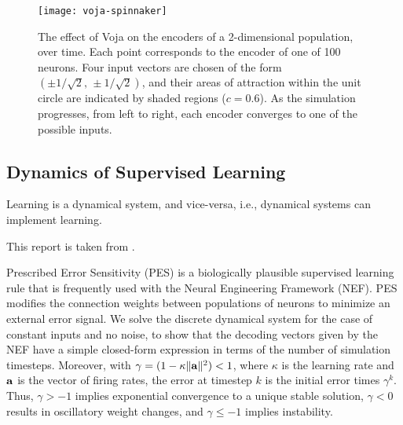 %
%
\begin{figure*}[!htb]
  \centering
  \texttt{[image: voja-spinnaker]}
  \caption{
The effect of Voja on the encoders of a 2-dimensional population, over time.
Each point corresponds to the encoder of one of \num{100} neurons.
Four input vectors are chosen of the form $(\pm 1 / \sqrt{2}, \, \pm 1 / \sqrt{2})$, and their areas of attraction within the unit circle are indicated by shaded regions ($c = 0.6$).
As the simulation progresses, from left to right, each encoder converges to one of the possible inputs.
}
  \label{fig:plasticity_nef/voja_encoders}
\end{figure*}

\subsection{Dynamics of Supervised Learning}

Learning is a dynamical system, and vice-versa, i.e., dynamical systems can implement learning.

This report is taken from \citep{voelker2015}.

Prescribed Error Sensitivity (PES) is a biologically plausible supervised learning rule that is frequently used with the Neural Engineering Framework (NEF). PES modifies the connection weights between populations of neurons to minimize an external error signal. We solve the discrete dynamical system for the case of constant inputs and no noise, to show that the decoding vectors given by the NEF have a simple closed-form expression in terms of the number of simulation timesteps. Moreover, with $\gamma = (1 - \kappa \|\mathbf{a}\|^2) < 1$, where $\kappa$ is the learning rate and $\mathbf{a}$ is the vector of firing rates, the error at timestep $k$ is the initial error times $\gamma^k$. Thus, $\gamma > - 1$ implies exponential convergence to a unique stable solution, $\gamma < 0 $ results in oscillatory weight changes, and $\gamma \le -1$ implies instability.

